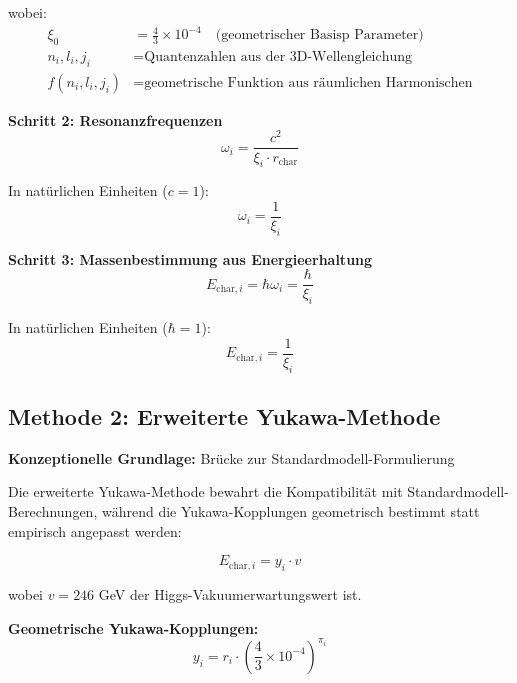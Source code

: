 wobei:
\begin{align}
	\xi_0 &= \frac{4}{3} \times 10^{-4} \quad \text{(geometrischer Basisp Parameter)} \\
	n_i, l_i, j_i &= \text{Quantenzahlen aus der 3D-Wellengleichung} \\
	f(n_i, l_i, j_i) &= \text{geometrische Funktion aus räumlichen Harmonischen}
\end{align}

\textbf{Schritt 2: Resonanzfrequenzen}
\begin{equation}
	\omega_i = \frac{c^2}{\xi_i \cdot r_{\text{char}}}
	\label{eq:resonance_frequencies}
\end{equation}

In natürlichen Einheiten ($c = 1$):
\begin{equation}
	\omega_i = \frac{1}{\xi_i}
\end{equation}

\textbf{Schritt 3: Massenbestimmung aus Energieerhaltung}
\begin{equation}
	E_{\text{char},i} = \hbar \omega_i = \frac{\hbar}{\xi_i}
	\label{eq:energy_from_frequency}
\end{equation}

In natürlichen Einheiten ($\hbar = 1$):
\begin{equation}
	\boxed{E_{\text{char},i} = \frac{1}{\xi_i}}
	\label{eq:characteristic_energy_direct}
\end{equation}

\subsection{Methode 2: Erweiterte Yukawa-Methode}
\label{subsec:extended_yukawa_method}

\textbf{Konzeptionelle Grundlage:} Brücke zur Standardmodell-Formulierung

Die erweiterte Yukawa-Methode bewahrt die Kompatibilität mit Standardmodell-Berechnungen, während die Yukawa-Kopplungen geometrisch bestimmt statt empirisch angepasst werden:

\begin{equation}
	E_{\text{char},i} = y_i \cdot v
	\label{eq:yukawa_mass_formula}
\end{equation}

wobei $v = 246$ GeV der Higgs-Vakuumerwartungswert ist.

\textbf{Geometrische Yukawa-Kopplungen:}
\begin{equation}
	\boxed{y_i = r_i \cdot \left(\frac{4}{3} \times 10^{-4}\right)^{\pi_i}}
	\label{eq:geometric_yukawa}
\end{equation}

